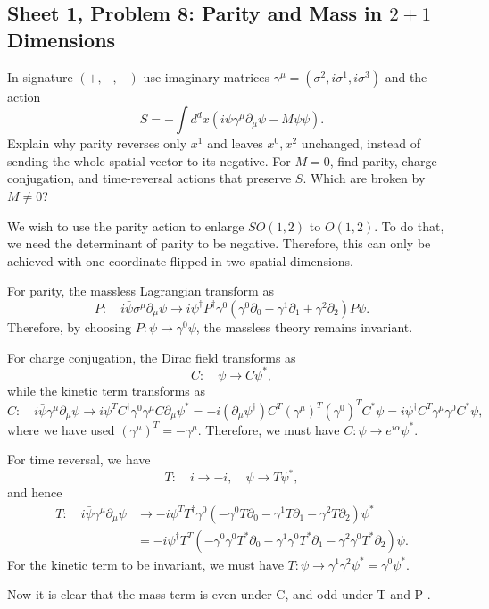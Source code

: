 \subsection{Sheet 1, Problem 8: Parity and Mass in $2+1$ Dimensions}

In signature $(+,-,-)$ use imaginary matrices
$\gamma^\mu=(\sigma^2,i\sigma^1,i\sigma^3)$ and the action
\begin{equation}
    S=-\int d^dx\left(i\bar\psi\gamma^\mu\partial_\mu\psi
    -M\bar\psi\psi\right).
\end{equation}
Explain why parity reverses only $x^1$ and leaves $x^0,x^2$
unchanged, instead of sending the whole spatial vector to its
negative. For $M=0$, find parity, charge-conjugation, and
time-reversal actions that preserve $S$. Which are broken by $M\ne0$?
\begin{solution}
    We wish to use the parity action to enlarge $SO(1,2)$ to $O(1,2)$. To do that, we need the determinant of parity to be negative. Therefore, this can only be achieved with one coordinate flipped in two spatial dimensions.

    For parity, the massless Lagrangian transform as
    \begin{equation}
        P:\quad i\bar \psi \sigma^\mu \partial_\mu \psi \to i\psi^\dagger P^\dagger\gamma^0(\gamma^0\partial_0 -  \gamma^1 \partial_1 + \gamma^2 \partial_2)P\psi.
    \end{equation}
    Therefore, by choosing $P: \psi \to \gamma^0 \psi$, the massless theory remains invariant.

    For charge conjugation, the Dirac field transforms as
    \begin{equation}
        C: \quad \psi \to C\psi^*,
    \end{equation}
    while the kinetic term transforms as
    \begin{equation}
        C: \quad i\bar\psi\gamma^\mu \partial_\mu \psi \to i \psi^TC^\dagger \gamma^0 \gamma^\mu C\partial_\mu\psi^* = -i(\partial_\mu \psi^\dagger)C^T (\gamma^\mu)^T (\gamma^0)^TC^*\psi = i\psi^\dagger C^T\gamma^\mu \gamma^0 C^* \psi,
    \end{equation}
    where we have used $(\gamma^\mu)^T = -\gamma^\mu$.
    Therefore, we must have $C:  \psi \to e^{i\alpha}\psi^*$.

    For time reversal, we have
    \begin{equation}
        T: \quad i \to -i, \quad \psi \to T \psi^*,
    \end{equation}
    and hence
    \begin{equation}
    \begin{aligned}
        T: \quad i\bar \psi \gamma^\mu \partial_\mu \psi &\to -i \psi^T T^\dagger \gamma^0 (-\gamma^0 T \partial_0 -\gamma^1 T \partial_1-\gamma^2 T \partial_2)\psi^*\\ &= -i\psi^\dagger T^T (-\gamma^0 \gamma^0 T^* \partial_0 - \gamma^1 \gamma^0 T^* \partial_1 - \gamma^2 \gamma^0 T^* \partial_2) \psi.
    \end{aligned}
    \end{equation}
    For the kinetic term to be invariant, we must have $T:\psi \to \gamma^1\gamma^2\psi^* = \gamma^0 \psi^*$.

    Now it is clear that the mass term is even under C, and odd under T and P .
\end{solution}

